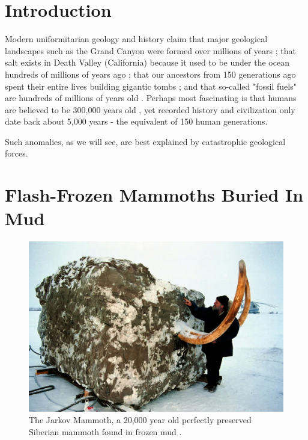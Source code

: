 \documentclass[10pt,twocolumn,letterpaper]{article}
\begin{document}

\section{Introduction}

Modern uniformitarian geology and history claim that major geological landscapes such as the Grand Canyon were formed over millions of years \cite{143}; that salt exists in Death Valley (California) because it used to be under the ocean hundreds of millions of years ago \cite{144}; that our ancestors from 150 generations ago spent their entire lives building gigantic tombs \cite{29,70}; and that so-called "fossil fuels" are hundreds of millions of years old \cite{104}. Perhaps most fascinating is that humans are believed to be 300,000 years old \cite{145}, yet recorded history and civilization only date back about 5,000 years - the equivalent of 150 human generations.

Such anomalies, as we will see, are best explained by catastrophic geological forces.

\section{Flash-Frozen Mammoths Buried In Mud}

\begin{figure}[t]
\begin{center}
   \includegraphics[width=1\linewidth]{jarkov-mammoth.jpg}
\end{center}
   \caption{The Jarkov Mammoth, a 20,000 year old perfectly preserved Siberian mammoth found in frozen mud \cite{51}.}
\label{fig:1}
\label{fig:onecol}
\end{figure}
\end{document}
